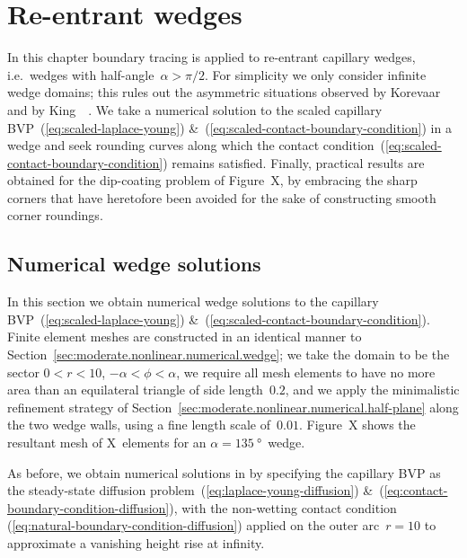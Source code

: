 \chapter{Re-entrant wedges}
\label{ch:re-entrant}

In this chapter
boundary tracing is applied to re-entrant capillary wedges,
i.e.~wedges with half-angle~$\alpha > \pi/2$.
For simplicity we only consider infinite wedge domains;
this rules out the asymmetric situations observed by
Korevaar~\cite{korevaar-1980-capillary-re-entrant-corner}
and by King~\etal~\cite{king-1999-laplace-young-near-corner}.
We take a numerical solution to
the scaled capillary BVP~(\ref{eq:scaled-laplace-young})
\&~(\ref{eq:scaled-contact-boundary-condition})
in a wedge
and seek rounding curves along which
the contact condition~(\ref{eq:scaled-contact-boundary-condition})
remains satisfied.
Finally, practical results are obtained for the dip-coating problem
of Figure~X, %
by embracing the sharp corners
that have heretofore been avoided
for the sake of constructing smooth corner roundings.

\section{Numerical wedge solutions}
\label{sec:re-entrant.numerical}

In this section we obtain numerical wedge solutions
to the capillary BVP~(\ref{eq:scaled-laplace-young})
\&~(\ref{eq:scaled-contact-boundary-condition}).
Finite element meshes are constructed in an identical manner
to Section~\ref{sec:moderate.nonlinear.numerical.wedge};
we take the domain to be the sector $0 < r < 10$, $-\alpha < \phi < \alpha$,
we require all mesh elements to have no more area
than an equilateral triangle of side length~$0.2$,
and we apply the minimalistic refinement strategy
of Section~\ref{sec:moderate.nonlinear.numerical.half-plane}
along the two wedge walls,
using a fine length scale of~$0.01$.
Figure~X %
shows the resultant mesh of X~elements
for an $\alpha = \SI{135}{\degree}$~wedge.

As before, we obtain numerical solutions in 
by specifying the capillary BVP
as the steady-state diffusion problem~(\ref{eq:laplace-young-diffusion})
\&~(\ref{eq:contact-boundary-condition-diffusion}),
with the non-wetting contact condition~%
  (\ref{eq:natural-boundary-condition-diffusion})
applied on the outer arc~$r = 10$
to approximate a vanishing height rise at infinity.

